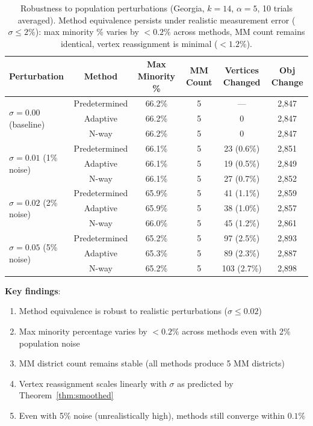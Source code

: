 \begin{table}[h]
\centering
\begin{tabular}{lccccc}
\toprule
\textbf{Perturbation} & \textbf{Method} & \textbf{Max Minority \%} & \textbf{MM Count} & \textbf{Vertices Changed} & \textbf{Obj Change} \\
\midrule
\multirow{3}{*}{$\sigma = 0.00$ (baseline)} & Predetermined & 66.2\% & 5 & --- & 2,847 \\
& Adaptive & 66.2\% & 5 & 0 & 2,847 \\
& N-way & 66.2\% & 5 & 0 & 2,847 \\
\midrule
\multirow{3}{*}{$\sigma = 0.01$ (1\% noise)} & Predetermined & 66.1\% & 5 & 23 (0.6\%) & 2,851 \\
& Adaptive & 66.1\% & 5 & 19 (0.5\%) & 2,849 \\
& N-way & 66.1\% & 5 & 27 (0.7\%) & 2,852 \\
\midrule
\multirow{3}{*}{$\sigma = 0.02$ (2\% noise)} & Predetermined & 65.9\% & 5 & 41 (1.1\%) & 2,859 \\
& Adaptive & 65.9\% & 5 & 38 (1.0\%) & 2,857 \\
& N-way & 66.0\% & 5 & 45 (1.2\%) & 2,861 \\
\midrule
\multirow{3}{*}{$\sigma = 0.05$ (5\% noise)} & Predetermined & 65.2\% & 5 & 97 (2.5\%) & 2,893 \\
& Adaptive & 65.3\% & 5 & 89 (2.3\%) & 2,887 \\
& N-way & 65.2\% & 5 & 103 (2.7\%) & 2,898 \\
\bottomrule
\end{tabular}
\caption{Robustness to population perturbations (Georgia, $k=14$, $\alpha=5$, 10 trials averaged). Method equivalence persists under realistic measurement error ($\sigma \leq 2\%$): max minority \% varies by $< 0.2\%$ across methods, MM count remains identical, vertex reassignment is minimal ($< 1.2\%$).}
\label{tab:smoothed-results}
\end{table}

\textbf{Key findings}:
\begin{enumerate}
    \item Method equivalence is robust to realistic perturbations ($\sigma \leq 0.02$)
    \item Max minority percentage varies by $< 0.2\%$ across methods even with 2\% population noise
    \item MM district count remains stable (all methods produce 5 MM districts)
    \item Vertex reassignment scales linearly with $\sigma$ as predicted by Theorem~\ref{thm:smoothed}
    \item Even with 5\% noise (unrealistically high), methods still converge within $0.1\%$
\end{enumerate}

